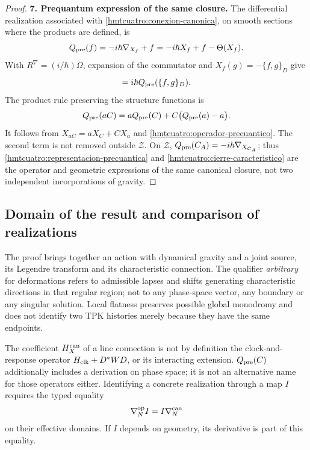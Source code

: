 \begin{proof}
\par\medskip\noindent\textbf{7. Prequantum expression of the same closure.}\quad
The differential realization associated with \eqref{hmtcuatro:conexion-canonica}, on smooth sections where the products are defined, is
\begin{equation}
 Q_{\rm pre}(f)=-i\hbar\nabla_{X_f}+f
            =-i\hbar X_f+f-\Theta(X_f).
 \label{hmtcuatro:operador-precuantico}
\end{equation}
With \(R^\nabla=(i/\hbar)\Omega\), expansion of the commutator and \(X_f(g)=-\{f,g\}_D\) give
\begin{equation}
 [Q_{\rm pre}(f),Q_{\rm pre}(g)]
           =i\hbar Q_{\rm pre}(\{f,g\}_D).
 \label{hmtcuatro:representacion-precuantica}
\end{equation}
The product rule preserving the structure functions is
\begin{equation}
 Q_{\rm pre}(aC)
   =aQ_{\rm pre}(C)+C\bigl(Q_{\rm pre}(a)-a\bigr).
 \label{hmtcuatro:funciones-estructura}
\end{equation}
It follows from \(X_{aC}=aX_C+CX_a\) and \eqref{hmtcuatro:operador-precuantico}. The second term is not removed outside \(\mathcal Z\). On \(\mathcal Z\), \(Q_{\rm pre}(C_A)=-i\hbar\nabla_{X_{C_A}}\); thus \eqref{hmtcuatro:representacion-precuantica} and \eqref{hmtcuatro:cierre-caracteristico} are the operator and geometric expressions of the same canonical closure, not two independent incorporations of gravity.
\end{proof}

\subsection{Domain of the result and comparison of realizations}
\label{hmtcuatro:alcance-canonico}

The proof brings together an action with dynamical gravity and a joint source, its Legendre transform and its characteristic connection. The qualifier \emph{arbitrary} for deformations refers to admissible lapses and shifts generating characteristic directions in that regular region; not to any phase-space vector, any boundary or any singular solution. Local flatness preserves possible global monodromy and does not identify two TPK histories merely because they have the same endpoints.

The coefficient \(H_X^{\rm can}\) of a line connection is not by definition the clock-and-response operator \(H_{\rm clk}+D^*WD\), or its interacting extension. \(Q_{\rm pre}(C)\) additionally includes a derivation on phase space; it is not an alternative name for those operators either. Identifying a concrete realization through a map \(I\) requires the typed equality
\[
 \nabla_N^{\rm op}I=I\nabla_N^{\rm can}
\]
on their effective domains. If \(I\) depends on geometry, its derivative is part of this equality.


